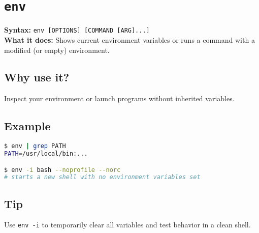 \documentclass[10pt,oneside]{scrbook}
\begin{document}
\section{\texttt{env}}
\begin{cmdbox}
  \textbf{Syntax:} \lstinline!env [OPTIONS] [COMMAND [ARG]...]! \\
  \textbf{What it does:} Shows current environment variables or runs a command with a modified (or empty) environment.
\end{cmdbox}
\begin{commanddetails}
  \subsection*{Why use it?}
    Inspect your environment or launch programs without inherited variables.

  \subsection*{Example}
  \begin{lstlisting}[language=bash]
$ env | grep PATH
PATH=/usr/local/bin:...

$ env -i bash --noprofile --norc
# starts a new shell with no environment variables set
  \end{lstlisting}

  \subsection*{Tip}
    Use \lstinline!env -i! to temporarily clear all variables and test behavior in a clean shell.
\end{commanddetails}

\end{document}
